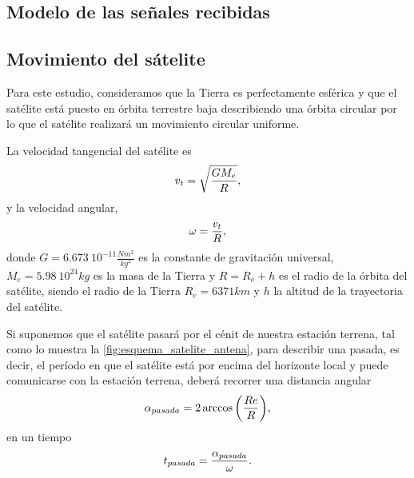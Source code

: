\documentclass{article}
\newenvironment{standalone}{\begin{preview}}{\end{preview}}
\begin{document}
\begin{standalone}
  \section{Modelo de las señales recibidas} \label{sec:modelo-senales}

  \subsection{Movimiento del sátelite}

  Para este estudio, consideramos que la Tierra es perfectamente esférica y que el satélite está puesto en órbita terrestre baja describiendo una órbita circular por lo que el satélite realizará un movimiento circular uniforme.

  La velocidad tangencial del satélite es
  \begin{equation}
    v_t = \sqrt{\frac{G M_e}{R}},
    \tagaddtext{[\si{\meter\per\second}]}
  \end{equation}
  y la velocidad angular,
  \begin{equation}
    \omega = \frac{v_t}{R},
    \tagaddtext{[\si{\radian\per\second}]}
  \end{equation}
  donde $G = 6.673 \ 10^{-11} \frac{N m^2}{kg^2} $ es la constante de gravitación universal, $M_e = 5.98 \ 10^{24} kg$ es la masa de la Tierra y $R = R_e + h$ es el radio de la órbita del satélite, siendo el radio de la Tierra $R_e = 6371 km$ y $h$ la altitud de la trayectoria del satélite.

  Si suponemos que el satélite pasará por el cénit de nuestra estación terrena, tal como lo muestra la \cref{fig:esquema_satelite_antena}, para describir una pasada, es decir, el período en que el satélite está por encima del horizonte local y puede comunicarse con la estación terrena, deberá recorrer una distancia angular \cite{ippolitojr2008}
  \begin{equation}
    \alpha_{pasada} = 2 \arccos{ \left( \frac{Re}{R} \right) },
    \tagaddtext{[\si{\radian}]}
  \end{equation}
  en un tiempo
  \begin{equation}
    t_{pasada} = \frac{\alpha_{pasada}}{\omega}.
    \tagaddtext{[\si{\second}]}
  \end{equation}


\end{standalone}
\end{document}
